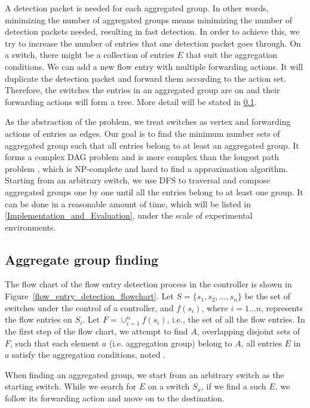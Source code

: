 A detection packet is needed for each aggregated group. In other words, minimizing the number of aggregated groups means minimizing the number of detection packets needed, resulting in fast detection. In order to achieve this, we try to increase the number of entries that one detection packet goes through. On a switch, there might be a collection of entries $E$ that suit the aggregation conditions. We can add a new flow entry with multiple forwarding actions. It will duplicate the detection packet and forward them according to the action set. Therefore, the switches the entries in an aggregated group are on and their forwarding actions will form a tree. More detail will be stated in \ref{Aggregated_group_finding}.

As the abstraction of the problem, we treat switches as vertex and forwarding actions of entries as edges. Our goal is to find the minimum number sets of aggregated group such that all entries belong to at least an aggregated group. It forms a complex DAG problem and is more complex than the longest path problem \cite{DMR97,RU04}, which is NP-complete and hard to find a approximation algorithm. Starting from an arbitrary switch, we use DFS to traversal and compose aggregated groups one by one until all the entries belong to at least one group. It can be done in a reasonable amount of time, which will be listed in \ref{Implementation_and_Evaluation}, under the scale of experimental environments.


\subsection{Aggregate group finding}
\label{Aggregated_group_finding}

The flow chart of the flow entry detection process in the controller is shown in Figure~\ref{flow_entry_detection_flowchart}. Let $S=\{s_1,s_2,\ldots,s_n\}$ be the set of switches under the control of a controller, and $f(s_i)$, where $i=1\ldots n$, represents the flow entries on $S_i$. Let $F=\cup_{i=1}^n f(s_i)$, i.e., the set of all the flow entries. In the first step of the flow chart, we attempt to find $A$, overlapping disjoint sets of $F$, such that each element $a$ (i.e. aggregation group) belong to $A$, all entries $E$ in $a$ satisfy the aggregation conditions, noted . 

When finding an aggregated group, we start from an arbitrary switch as the starting switch. While we search for $E$ on a switch $S_x$, if we find a such $E$, we follow its forwarding action and move on to the destination. 



